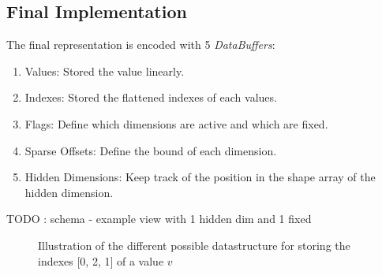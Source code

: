 \subsection{Final Implementation}
	
	The final representation is encoded with 5 \textit{DataBuffers}:
	\begin{enumerate}
		\item Values: Stored the value linearly.
		\item Indexes: Stored the flattened indexes of each values.
		\item Flags: Define which dimensions are active and which are fixed.
		\item Sparse Offsets: Define the bound of each dimension.
		\item Hidden Dimensions: Keep track of the position in the shape array of the hidden dimension.
	\end{enumerate}
	TODO : schema - example view with 1 hidden dim and 1 fixed

	\begin{figure}[!h]
		\centering
		\qquad
		\qquad

	
		\caption{Illustration of the different possible datastructure for storing the indexes  [0, 2, 1] of a value $v$ }
	\end{figure}
	
